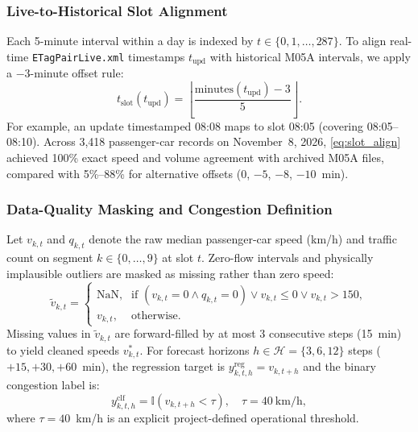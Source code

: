 \documentclass[conference]{IEEEtran}
\begin{document}
\subsubsection{Live-to-Historical Slot Alignment}
Each 5-minute interval within a day is indexed by $t \in \{0, 1, \dots, 287\}$. To align real-time \texttt{ETagPairLive.xml} timestamps $t_{\text{upd}}$ with historical M05A intervals, we apply a $-3$-minute offset rule:
\begin{equation}
t_{\text{slot}}(t_{\text{upd}}) = \left\lfloor \frac{\text{minutes}(t_{\text{upd}}) - 3}{5} \right\rfloor.
\label{eq:slot_align}
\end{equation}
For example, an update timestamped 08:08 maps to slot 08:05 (covering 08:05--08:10). Across 3,418 passenger-car records on November~8, 2026, \eqref{eq:slot_align} achieved 100\% exact speed and volume agreement with archived M05A files, compared with 5\%--88\% for alternative offsets (0, $-5$, $-8$, $-10$~min).

\subsubsection{Data-Quality Masking and Congestion Definition}
Let $v_{k,t}$ and $q_{k,t}$ denote the raw median passenger-car speed (km/h) and traffic count on segment $k \in \{0,\dots,9\}$ at slot $t$. Zero-flow intervals and physically implausible outliers are masked as missing rather than zero speed:
\begin{equation}
\tilde{v}_{k,t} =
\begin{cases}
\text{NaN}, & \text{if } (v_{k,t}=0 \land q_{k,t}=0) \lor v_{k,t}\le 0 \lor v_{k,t}>150, \\
v_{k,t}, & \text{otherwise}.
\end{cases}
\label{eq:quality_mask}
\end{equation}
Missing values in $\tilde{v}_{k,t}$ are forward-filled by at most 3 consecutive steps (15~min) to yield cleaned speeds $v^*_{k,t}$. For forecast horizons $h \in \mathcal{H} = \{3, 6, 12\}$ steps ($+15, +30, +60$~min), the regression target is $y^{\text{reg}}_{k,t,h} = v_{k,t+h}$ and the binary congestion label is:
\begin{equation}
y^{\text{clf}}_{k,t,h} = \mathbb{I}\!\left(v_{k,t+h} < \tau\right), \quad \tau = 40~\text{km/h},
\label{eq:cong_def}
\end{equation}
where $\tau = 40$~km/h is an explicit project-defined operational threshold.
\end{document}
